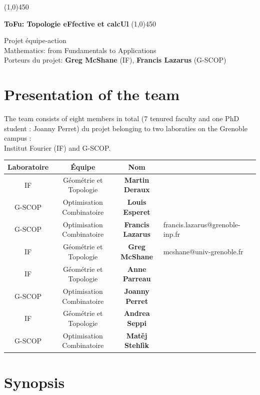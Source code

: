 \documentclass[14pt,fleqn]{article}
\begin{document}
\begin{center}
\line(1,0){450}

\vspace{0.2in}
{\huge \bf ToFu: Topologie eFfective et calcUl}
\vspace{0.2in}
\line(1,0){450}
\bigskip

Projet équipe-action  \\
Mathematics: from Fundamentals to Applications
\\
Porteurs du projet:  {\bf Greg McShane} (IF),  {\bf Francis Lazarus} (G-SCOP)
\end{center}


\tableofcontents

\newpage

\section{Presentation of the team}
The team consists of eight members in total (7 tenured faculty and one PhD student : Joanny Perret) du projet belonging to two  laboraties on the Grenoble campus : \\
Institut Fourier (IF) and G-SCOP.

\smallskip
\vspace{.5cm}
\begin{center}
\begin{tabular}[h]{|c|c|c|l|l|}
  \hline
 Laboratoire & Équipe & Nom \\
\hline \hline
IF & Géométrie et Topologie & {\bf Martin Deraux} &\\
\hline
G-SCOP & Optimisation Combinatoire & {\bf Louis Esperet}& \\
\hline
G-SCOP & Optimisation Combinatoire & {\bf Francis Lazarus}& 
francis.lazarus@grenoble-inp.fr\\
\hline
IF & Géométrie et Topologie & {\bf Greg McShane}&
mcshane@univ-grenoble.fr \\
\hline
IF & Géométrie et Topologie & {\bf Anne Parreau}& \\
\hline
G-SCOP & Optimisation Combinatoire & {\bf Joanny Perret}& \\
\hline
IF & Géométrie et Topologie & {\bf Andrea Seppi}& \\
\hline
G-SCOP & Optimisation Combinatoire & {\bf Mat\v{e}j Stehlìk}& \\
\hline
\end{tabular}
\end{center}

\section{Synopsis}
\end{document}
